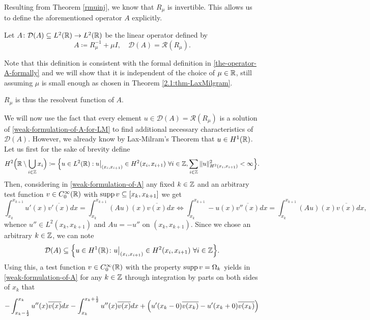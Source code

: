 Resulting from Theorem \ref{rmuinj}, we know that $R_{\mu}$ is invertible. This allows us to define the aforementioned operator $A$ explicitly.
\begin{definition}
	Let $A \colon \mathcal{D}(A) \subseteq L^{2}(\mathbb{R}) \rightarrow L^{2}(\mathbb{R})$ be the linear operator defined by
	\[ A \coloneqq R_{\mu}^{-1} + \mu I, \quad \mathcal{D}(A) = \mathcal{R}(R_{\mu}). \]
\end{definition}
Note that this definition is consistent with the formal definition in \eqref{the-operator-A-formally} and we will show that it is independent of the choice of $\mu \in \mathbb{R}$, still assuming $\mu$ is small enough as chosen in Theorem \ref{2.1:thm-LaxMilgram}. 
\begin{remark}
	$R_{\mu}$ is thus the resolvent function of $A$.
\end{remark}
We will now use the fact that every element $u \in \mathcal{D}(A) = \mathcal{R}(R_{\mu})$ is a solution of \eqref{weak-formulation-of-A-for-LM} to find additional necessary  characteristics of $\mathcal{D}(A)$. However, we already know by Lax-Milram's Theorem that $u \in H^{1}(\mathbb{R})$. Let us first for the sake of brevity define
\[ H^{2}\Big(\mathbb{R} \setminus \bigcup_{i \in \mathbb{Z}} x_{i} \Big) \coloneqq \Big\{ u\in L^{2}(\mathbb{R}) : u\big|_{(x_{i}, x_{i+1})} \in H^{2}(x_{i}, x_{i+1}) ~\forall i \in \mathbb{Z}, \sum_{i \in \mathbb{Z}} \|u\|^{2}_{H^{2}(x_{i}, x_{i+1})} < \infty \Big\}. \]
Then, considering in \eqref{weak-formulation-of-A} any fixed $k \in \mathbb{Z}$ and an arbitrary test function $v \in C_{0}^{\infty}(\mathbb{R})$ with $\operatorname{supp} v \subseteq [x_{k}, x_{k+1}]$ we get 
	\begin{equation}
		\int_{x_{k}}^{x_{k + 1}} u'(x) \overline{v'(x)} dx = \int_{x_{k}}^{x_{k+1}} \left(Au\right)(x) \overline{v(x)} dx \iff \int_{x_{k}}^{x_{k+1}} - u(x) \overline{v''(x)} dx = \int_{x_{k}}^{x_{k+1}} \left(Au\right)(x) \overline{v(x)} dx, \label{temp-link}
	\end{equation} 
whence $u'' \in L^{2}(x_{k}, x_{k + 1})$ and $A u = - u''$ on $(x_{k}, x_{k + 1})$. Since we chose an arbitrary $k \in \mathbb{Z}$, we can note 
	$$ \mathcal{D}(A) \subseteq \Big\{ u \in H^{1}(\mathbb{R}) \colon u\big|_{(x_{i}, x_{i+1})} \in H^{2}(x_{i}, x_{i+1}) ~\forall i \in \mathbb{Z} \Big\}. $$
Using this, a test function $v \in C_{0}^{\infty}(\mathbb{R})$ with the property $\operatorname{supp} v = \Omega_{k}$ yields in \eqref{weak-formulation-of-A} for any $k \in \mathbb{Z}$ through integration by parts on both sides of $x_{k}$ that
	\[ - \int_{x_{k}-\frac{1}{2}}^{x_{k}} u''(x) \overline{v(x)} dx - \int_{x_{k}}^{x_{k} + \frac{1}{2}} u''(x) \overline{v(x)} dx + \left( u'(x_{k}-0) \overline{v(x_{k})} - u'(x_{k} + 0) \overline{v(x_{k})} \right) \\ \]
